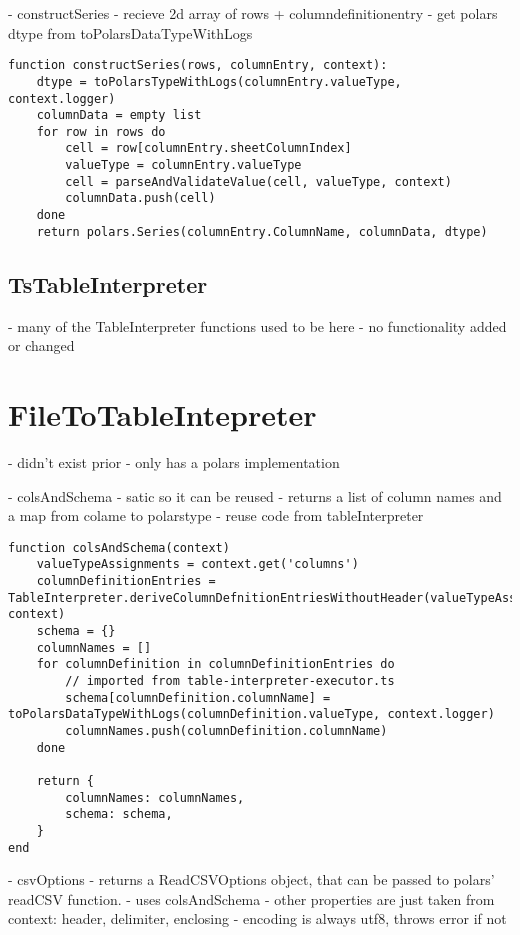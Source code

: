 - constructSeries
- recieve 2d array of rows + columndefinitionentry
- get polars dtype from toPolarsDataTypeWithLogs
\begin{listing}
	\begin{verbatim}
function constructSeries(rows, columnEntry, context):
	dtype = toPolarsTypeWithLogs(columnEntry.valueType, context.logger)
	columnData = empty list
	for row in rows do
		cell = row[columnEntry.sheetColumnIndex]
		valueType = columnEntry.valueType
		cell = parseAndValidateValue(cell, valueType, context)
		columnData.push(cell)
	done
	return polars.Series(columnEntry.ColumnName, columnData, dtype)
	\end{verbatim}
	\caption{}
	\label{lst:polarsTableInterpreter:constructSeries}
\end{listing}

\subsection{TsTableInterpreter}
- many of the TableInterpreter functions used to be here
- no functionality added or changed

\section{FileToTableIntepreter}
- didn't exist prior
- only has a polars implementation

- colsAndSchema
- satic so it can be reused
- returns a list of column names and a map from colame to polarstype
- reuse code from tableInterpreter
\begin{listing}
	\begin{verbatim}
function colsAndSchema(context)
	valueTypeAssignments = context.get('columns')
	columnDefinitionEntries = TableInterpreter.deriveColumnDefnitionEntriesWithoutHeader(valueTypeAssignments, context)
	schema = {}
	columnNames = []
	for columnDefinition in columnDefinitionEntries do
		// imported from table-interpreter-executor.ts
		schema[columnDefinition.columnName] = toPolarsDataTypeWithLogs(columnDefinition.valueType, context.logger)
		columnNames.push(columnDefinition.columnName)
	done

	return {
		columnNames: columnNames,
		schema: schema,
	}
end
	\end{verbatim}
\end{listing}

- csvOptions
- returns a ReadCSVOptions object, that can be passed to polars' readCSV function.
- uses colsAndSchema
- other properties are just taken from context: header, delimiter, enclosing
- encoding is always utf8, throws error if not

